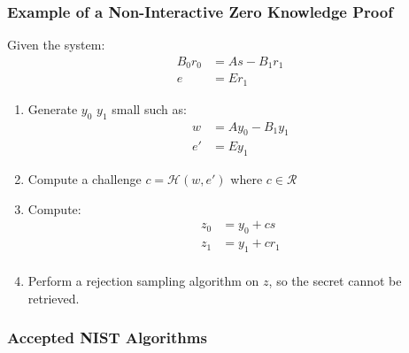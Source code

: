 \documentclass[presentation]{beamer}
\begin{document}
\begin{frame}[label=non-interactive-zero-knowledge-proof]
  \frametitle{Example of a Non-Interactive Zero Knowledge Proof}

  Given the system:
  \begin{equation*}
    \begin{array}{rl}
      B_0r_0 &= As - B_1r_1 \\
      e &= E r_1
    \end{array}
  \end{equation*}

  \begin{enumerate}
    \item Generate $y_0$ $y_1$ small such as:
      \begin{equation*}
        \begin{array}{rl}
          w  &= Ay_0 - B_1y_1 \\
          e' &= E y_1
        \end{array}
      \end{equation*}
    \item Compute a challenge $c = \mathcal H (w, e')$ where
      $c \in \mathcal R$
  
    \item Compute:
  \begin{equation*}
    \begin{array}{rl}
      z_0 &= y_0 + cs \\
      z_1 &= y_1 + cr_1 \\
    \end{array}
  \end{equation*}
    \item Perform a rejection sampling algorithm on $z$, 
      so the secret cannot be retrieved.
  \end{enumerate}

\end{frame}
\begin{frame}[label=accepted-nist-algorithms]
  \frametitle{Accepted NIST Algorithms}
  
\end{frame}
\end{document}
